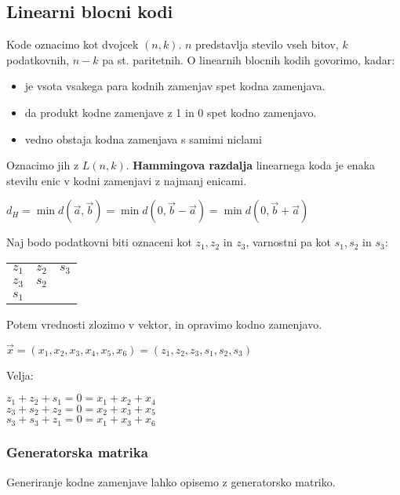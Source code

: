 \documentclass{article}
\begin{document}
\begin{multicols}{2}
	\subsection{Linearni blocni kodi}
	Kode oznacimo kot dvojcek $(n, k)$. $n$ predstavlja stevilo vseh bitov, $k$ podatkovnih, $n - k$ pa st. paritetnih.
	O linearnih blocnih kodih govorimo, kadar:
	\begin{itemize}
		\item je vsota vsakega para kodnih zamenjav spet kodna zamenjava.
		\item da produkt kodne zamenjave z 1 in 0 spet kodno zamenjavo.
		\item vedno obstaja kodna zamenjava s samimi niclami
	\end{itemize}
	Oznacimo jih z $L(n, k)$. \textbf{Hammingova razdalja} linearnega koda je enaka stevilu enic v kodni zamenjavi
	z najmanj enicami.
	\begin{center}
		\begin{math}
			d_H = \min d(\vec{a}, \vec{b}) = \min d(0, \vec{b} - \vec{a}) = \min d(0 , \vec{b} + \vec{a})
		\end{math}
	\end{center}

	Naj bodo podatkovni biti oznaceni kot $z_1, z_2 \text{ in } z_3$, varnostni pa kot $s_1, s_2 \text{ in } s_3$:
	\begin{center}
		\begin{tabular}{ ccc }
			$z_1$ & $z_2$ & $s_3$ \\
			$z_3$ & $s_2$ &       \\
			$s_1$ &       &       \\
		\end{tabular}
	\end{center}
	Potem vrednosti zlozimo v vektor, in opravimo kodno zamenjavo.
	\begin{center}
		\begin{math}
			\vec{x} = (x_1, x_2, x_3, x_4, x_5, x_6) = (z_1, z_2, z_3, s_1, s_2, s_3)
		\end{math}
	\end{center}
	Velja:
	\begin{center}
		$z_1 + z_2 + s_1 = 0 = x_1 + x_2 + x_4$\\
		$z_3 + s_2 + z_2 = 0 = x_2 + x_3 + x_5$\\
		$s_3 + s_3 + z_1 = 0 = x_1 + x_3 + x_6$\\
	\end{center}


	\subsubsection{Generatorska matrika}
	Generiranje kodne zamenjave lahko opisemo z generatorsko matriko.


\end{multicols}
\end{document}
